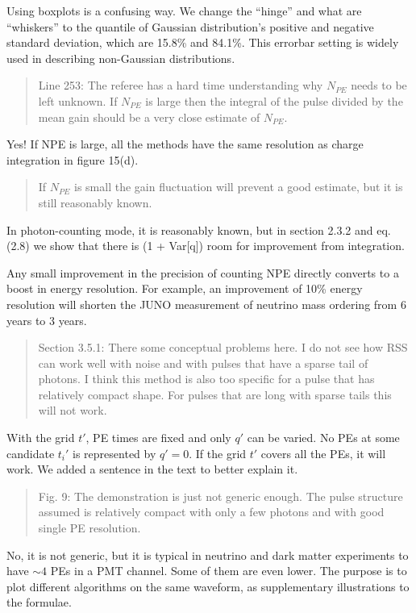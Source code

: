 \documentclass[12pt]{article}
\begin{document}
Using boxplots is a confusing way. We change the ``hinge'' and what are ``whiskers'' to the quantile of Gaussian distribution's positive and negative standard deviation, which are 15.8\% and 84.1\%. This errorbar setting is widely used in describing non-Gaussian distributions.

\begin{quote}
Line 253: The referee has a hard time understanding why $N_{PE}$ needs to be left unknown. If $N_{PE}$ is large then the integral of the pulse divided by the mean gain should be a very close estimate of $N_{PE}$. 
\end{quote}

Yes! If NPE is large, all the methods have the same resolution as charge integration in figure 15(d).

\begin{quote}
If $N_{PE}$ is small the gain fluctuation will prevent a good estimate, but it is still reasonably known.
\end{quote}

In photon-counting mode, it is reasonably known, but in section 2.3.2 and eq. (2.8) we show that there is (1 + Var[q]) room for improvement from integration.

Any small improvement in the precision of counting NPE directly converts to a boost in energy resolution. For example, an improvement of 10\% energy resolution will shorten the JUNO measurement of neutrino mass ordering from 6 years to 3 years.

\begin{quote}
Section 3.5.1: There some conceptual problems here. I do not see how RSS can work well with noise and with pulses that have a sparse tail of photons. I think this method is also too specific for a pulse that has relatively compact shape. For pulses that are long with sparse tails this will not work.
\end{quote}

With the grid $t'$, PE times are fixed and only $q'$ can be varied.  No PEs at some candidate $t_i'$ is represented by $q'=0$.  If the grid $t'$ covers all the PEs, it will work.  We added a sentence in the text to better explain it.

\begin{quote}
Fig. 9: The demonstration is just not generic enough. The pulse structure assumed is relatively compact with only a few photons and with good single PE resolution.
\end{quote}

No, it is not generic, but it is typical in neutrino and dark matter experiments to have $\sim 4$ PEs in a PMT channel.  Some of them are even lower. The purpose is to plot different algorithms on the same waveform, as supplementary illustrations to the formulae.
\end{document}
